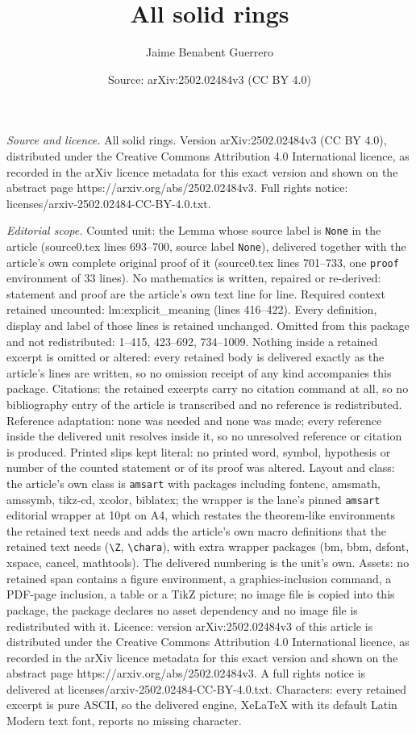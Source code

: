 \documentclass[10pt,a4paper]{amsart}
\title[All solid rings]{All solid rings}
\author{Jaime Benabent Guerrero}
\date{Source: arXiv:2502.02484v3 (CC BY 4.0)}
\begin{document}
\maketitle

\noindent\emph{Source and licence.} All solid rings. Version arXiv:2502.02484v3 (CC BY 4.0), distributed under the Creative Commons Attribution 4.0 International licence, as recorded in the arXiv licence metadata for this exact version and shown on the abstract page https://arxiv.org/abs/2502.02484v3. Full rights notice: licenses/arxiv-2502.02484-CC-BY-4.0.txt.\par\smallskip

\noindent\textit{Editorial scope.} Counted unit: the Lemma whose source label is \texttt{None} in the article (source0.tex lines 693--700, source label \texttt{None}), delivered together with the article's own complete original proof of it (source0.tex lines 701--733, one \texttt{proof} environment of 33 lines). No mathematics is written, repaired or re-derived: statement and proof are the article's own text line for line. Required context retained uncounted: lm:explicit\_meaning (lines 416--422). Every definition, display and label of those lines is retained unchanged. Omitted from this package and not redistributed: 1--415, 423--692, 734--1009. Nothing inside a retained excerpt is omitted or altered: every retained body is delivered exactly as the article's lines are written, so no omission receipt of any kind accompanies this package. Citations: the retained excerpts carry no citation command at all, so no bibliography entry of the article is transcribed and no reference is redistributed. Reference adaptation: none was needed and none was made; every reference inside the delivered unit resolves inside it, so no unresolved reference or citation is produced. Printed slips kept literal: no printed word, symbol, hypothesis or number of the counted statement or of its proof was altered. Layout and class: the article's own class is \texttt{amsart} with packages including fontenc, amsmath, amssymb, tikz-cd, xcolor, biblatex; the wrapper is the lane's pinned \texttt{amsart} editorial wrapper at 10pt on A4, which restates the theorem-like environments the retained text needs and adds the article's own macro definitions that the retained text needs (\texttt{\textbackslash Z}, \texttt{\textbackslash chara}), with extra wrapper packages (bm, bbm, dsfont, xspace, cancel, mathtools). The delivered numbering is the unit's own. Assets: no retained span contains a figure environment, a graphics-inclusion command, a PDF-page inclusion, a table or a TikZ picture; no image file is copied into this package, the package declares no asset dependency and no image file is redistributed with it. Licence: version arXiv:2502.02484v3 of this article is distributed under the Creative Commons Attribution 4.0 International licence, as recorded in the arXiv licence metadata for this exact version and shown on the abstract page https://arxiv.org/abs/2502.02484v3. A full rights notice is delivered at licenses/arxiv-2502.02484-CC-BY-4.0.txt. Characters: every retained excerpt is pure ASCII, so the delivered engine, XeLaTeX with its default Latin Modern text font, reports no missing character.
\end{document}

